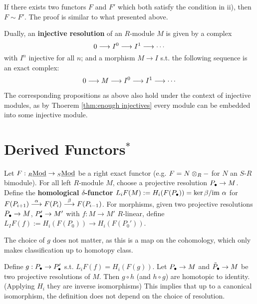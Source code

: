\begin{remark}
    If there exists two functors $F$ and $F'$ which both satisfy the condition in ii), then $F \sim F'$. The proof is similar to what presented above.
\end{remark}

\begin{definition}
    Dually, an \textbf{injective resolution} of an $R$-module $M$ is given by a complex 
    \[
        0 \longrightarrow I^0 \longrightarrow I^1 \longrightarrow \cdots
    \]
    with $I^n$ injective for all $n$; and a morphism $M \to I$ s.t. the following sequence is an exact complex:
    \[
        0 \longrightarrow M \longrightarrow I^0 \longrightarrow I^1 \longrightarrow \cdots
    \]
\end{definition}

\begin{remark}
    The corresponding propositions as above also hold under the context of injective modules, as by Thoerem \ref{thm:enough injectives} every module can be embedded into some injective module. 
\end{remark}

\section{Derived Functors$^*$}

\begin{definition}
    Let $F: {}_{R}\underline{\textup{Mod}} \to {}_{S}\underline{\textup{Mod}}$ be a right exact functor (e.g. $F = N \otimes_R -$ for $N$ an $S$-$R$ bimodule). For all left $R$-module $M$, choose a projective resolution $P_{\bullet} \to M$. Define the \textbf{homological $\delta$-functor} ${L_iF}(M) := H_i(F(P_{\bullet})) = \ker \beta/ \mathrm{im}\  \alpha$ for $F(P_{i+1}) \overset{\alpha}{\longrightarrow} F(P_i) \overset{\beta}{\longrightarrow} F(P_{i-1})$. For morphisms, given two projective resolutions $P_{\bullet} \to M$, $P_{\bullet}' \to M'$ with $f: M \to M'$ $R$-linear, define $L_I F(f) := H_i(F(P_0)) \to H_i(F(P_0'))$.
\end{definition}

\begin{remark}
    The choice of $g$ does not matter, as this is a map on the cohomology, which only makes classification up to homotopy class.
\end{remark}

\begin{remark}
    Define $g: P_{\bullet} \to P_{\bullet}'$ s.t. $L_i F(f) = H_i(F(g))$. Let $P_{\bullet} \to M$ and $\tilde{P}_{\bullet} \to M$ be two projective resolutions of $M$. Then $g \circ h$ (and $h \circ g$) are homotopic to identity. (Applying $H_i$ they are inverse isomorphisms) This implies that up to a canonical isomorphism, the definition does not depend on the choice of resolution.
\end{remark}

